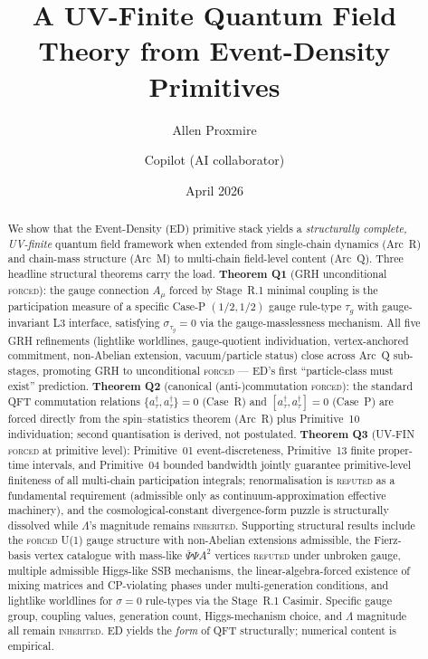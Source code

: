 \documentclass[11pt,a4paper]{article}
\title{A UV-Finite Quantum Field Theory from Event-Density Primitives}
\author{Allen Proxmire \and Copilot (AI collaborator)}
\date{April 2026}
\begin{document}
\maketitle

\begin{abstract}
We show that the Event-Density (ED) primitive stack yields a \emph{structurally complete, UV-finite} quantum field framework when extended from single-chain dynamics (Arc~R) and chain-mass structure (Arc~M) to multi-chain field-level content (Arc~Q). Three headline structural theorems carry the load. \textbf{Theorem Q1} (GRH unconditional \textsc{forced}): the gauge connection $A_\mu$ forced by Stage~R.1 minimal coupling is the participation measure of a specific Case-P $(1/2, 1/2)$ gauge rule-type $\tau_g$ with gauge-invariant L3 interface, satisfying $\sigma_{\tau_g} = 0$ via the gauge-masslessness mechanism. All five GRH refinements (lightlike worldlines, gauge-quotient individuation, vertex-anchored commitment, non-Abelian extension, vacuum/particle status) close across Arc~Q sub-stages, promoting GRH to unconditional \textsc{forced} --- ED's first ``particle-class must exist'' prediction. \textbf{Theorem Q2} (canonical (anti-)commutation \textsc{forced}): the standard QFT commutation relations $\{a^\dagger_\tau, a^\dagger_\tau\} = 0$ (Case~R) and $[a^\dagger_\tau, a^\dagger_\tau] = 0$ (Case~P) are forced directly from the spin--statistics theorem (Arc~R) plus Primitive~10 individuation; second quantisation is derived, not postulated. \textbf{Theorem Q3} (UV-FIN \textsc{forced} at primitive level): Primitive~01 event-discreteness, Primitive~13 finite proper-time intervals, and Primitive~04 bounded bandwidth jointly guarantee primitive-level finiteness of all multi-chain participation integrals; renormalisation is \textsc{refuted} as a fundamental requirement (admissible only as continuum-approximation effective machinery), and the cosmological-constant divergence-form puzzle is structurally dissolved while $\Lambda$'s magnitude remains \textsc{inherited}. Supporting structural results include the \textsc{forced} U(1) gauge structure with non-Abelian extensions admissible, the Fierz-basis vertex catalogue with mass-like $\bar\Psi\Psi A^2$ vertices \textsc{refuted} under unbroken gauge, multiple admissible Higgs-like SSB mechanisms, the linear-algebra-forced existence of mixing matrices and CP-violating phases under multi-generation conditions, and lightlike worldlines for $\sigma = 0$ rule-types via the Stage~R.1 Casimir. Specific gauge group, coupling values, generation count, Higgs-mechanism choice, and $\Lambda$ magnitude all remain \textsc{inherited}. ED yields the \emph{form} of QFT structurally; numerical content is empirical.
\end{abstract}
\end{document}
